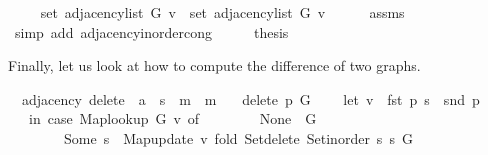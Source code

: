 \begin{isabellebody}
\ \isamarkupfalse%
\ {\isachardoublequoteopen}{\isachardot}{\kern0pt}{\isachardot}{\kern0pt}{\isachardot}{\kern0pt}\ {\isacharequal}{\kern0pt}\ set\ {\isacharparenleft}{\kern0pt}adjacency{\isacharunderscore}{\kern0pt}list\ G{}\ v{\isacharparenright}{\kern0pt}\ {\isasymunion}\ set\ {\isacharparenleft}{\kern0pt}adjacency{\isacharunderscore}{\kern0pt}list\ G{}\ v{\isacharparenright}{\kern0pt}{\isachardoublequoteclose}\isanewline
\ \ \ \ \isamarkupfalse%
\ assms{\isacharparenleft}{\kern0pt}{}{\isacharparenright}{\kern0pt}\isanewline
\ \ \ \ \isamarkupfalse%
\ {\isacharparenleft}{\kern0pt}simp\ add{\isacharcolon}{\kern0pt}\ adjacency{\isacharunderscore}{\kern0pt}inorder{\isacharunderscore}{\kern0pt}cong{\isacharparenright}{\kern0pt}\isanewline
\ \ \isamarkupfalse%
\ \isamarkupfalse%
\ {\isacharquery}{\kern0pt}thesis\isanewline
\ \ \ \ \isacommand{{\isachardot}{\kern0pt}}\isamarkupfalse%
\isanewline
{}\isamarkupfalse%
%
\endisatagproof
{\isafoldproof}%
%
\isadelimproof
%
\endisadelimproof
%
\begin{isamarkuptext}%
Finally, let us look at how to compute the difference of two graphs.%
\end{isamarkuptext}\isamarkuptrue%
\isamarkupfalse%
\ {\isacharparenleft}{\kern0pt}\ adjacency{\isacharparenright}{\kern0pt}\ delete{\isacharunderscore}{\kern0pt}{}\ {\isacharcolon}{\kern0pt}{\isacharcolon}{\kern0pt}\ {\isachardoublequoteopen}{\isacharprime}{\kern0pt}a\ {\isasymtimes}\ {\isacharprime}{\kern0pt}s\ {\isasymRightarrow}\ {\isacharprime}{\kern0pt}m\ {\isasymRightarrow}\ {\isacharprime}{\kern0pt}m{\isachardoublequoteclose}\ \isanewline
\ \ {\isachardoublequoteopen}delete{\isacharunderscore}{\kern0pt}{}\ p\ G\ {\isasymequiv}\isanewline
\ \ \ let\ v\ {\isacharequal}{\kern0pt}\ fst\ p{\isacharsemicolon}{\kern0pt}\ s\ {\isacharequal}{\kern0pt}\ snd\ p\isanewline
\ \ \ in\ case\ Map{\isacharunderscore}{\kern0pt}lookup\ G\ v\ of\isanewline
\ \ \ \ \ \ \ \ None\ {\isasymRightarrow}\ G\ {\isacharbar}{\kern0pt}\isanewline
\ \ \ \ \ \ \ \ Some\ s{\isacharprime}{\kern0pt}\ {\isasymRightarrow}\ Map{\isacharunderscore}{\kern0pt}update\ v\ {\isacharparenleft}{\kern0pt}fold\ Set{\isacharunderscore}{\kern0pt}delete\ {\isacharparenleft}{\kern0pt}Set{\isacharunderscore}{\kern0pt}inorder\ s{\isacharparenright}{\kern0pt}\ s{\isacharprime}{\kern0pt}{\isacharparenright}{\kern0pt}\ G{\isachardoublequoteclose}\isanewline

\end{isabellebody}
